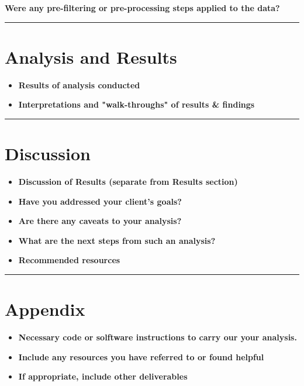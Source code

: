 \documentclass[12pt,]{article}
\providecommand{\tightlist}{%
  \setlength{\itemsep}{0pt}\setlength{\parskip}{0pt}}
\begin{document}
\textbf{Were any pre-filtering or pre-processing steps applied to the data?}

\begin{center}\rule{0.5\linewidth}{\linethickness}\end{center}

\hypertarget{analysis-and-results}{%
\section{Analysis and Results}\label{analysis-and-results}}

\begin{itemize}
\tightlist
\item
  \textbf{Results of analysis conducted}
\item
  \textbf{Interpretations and "walk-throughs" of results \& findings}
\end{itemize}

\begin{center}\rule{0.5\linewidth}{\linethickness}\end{center}

\hypertarget{discussion}{%
\section{Discussion}\label{discussion}}

\begin{itemize}
\tightlist
\item
  \textbf{Discussion of Results (separate from Results section)}
\item
  \textbf{Have you addressed your client's goals?}
\item
  \textbf{Are there any caveats to your analysis?}
\item
  \textbf{What are the next steps from such an analysis?}
\item
  \textbf{Recommended resources}
\end{itemize}

\begin{center}\rule{0.5\linewidth}{\linethickness}\end{center}

\hypertarget{appendix}{%
\section{Appendix}\label{appendix}}

\begin{itemize}
\tightlist
\item
  \textbf{Necessary code or solftware instructions to carry our your analysis.}\\
\item
  \textbf{Include any resources you have referred to or found helpful}
\item
  \textbf{If appropriate, include other deliverables}
\end{itemize}
\end{document}
